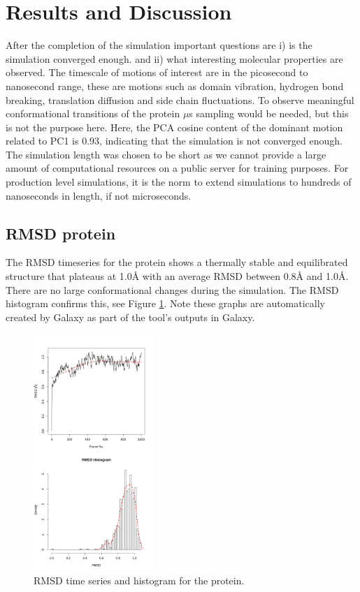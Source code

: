 \documentclass[twocolumn]{bmcart}%
\begin{document}
\hypertarget{resultsanddiscussion}{%
\section*{Results and Discussion}\label{resultsanddiscussion}}
After the completion of the simulation important questions are i) is the simulation converged enough.  and ii) what interesting molecular properties are observed. The timescale of motions of interest are in the picosecond to nanosecond range, these are motions such as domain vibration, hydrogen bond breaking, translation diffusion and side chain fluctuations. To observe meaningful conformational transitions of the protein $\mu$s sampling would be needed, but this is not the purpose here. Here, the PCA cosine content of the dominant motion related to PC1 is 0.93, indicating that the simulation is not converged enough. The simulation length was chosen to be short as we cannot provide a large amount of computational resources on a public server for training purposes. For production level simulations, it is the norm to extend simulations to hundreds of nanoseconds in length, if not microseconds.

\subsection*{RMSD protein}
The RMSD timeseries for the protein shows a thermally stable and equilibrated structure that plateaus at 1.0{\AA} with an average RMSD between 0.8{\AA} and 1.0{\AA}. There are no large conformational changes during the simulation. The RMSD histogram confirms this, see Figure \ref{fig:rmsdprotein}. Note these graphs are automatically created by Galaxy as part of the tool's outputs in Galaxy.

\begin{figure}[ht!]
  \includegraphics[width=0.4\textwidth]{htmd_analysis_rmsd1_merge}
  \caption{
      RMSD time series and histogram for the protein.}
  \label{fig:rmsdprotein}
\end{figure}
\end{document}
